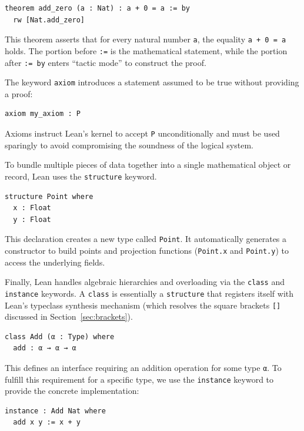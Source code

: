 \begin{lstlisting}[language=Lean]
theorem add_zero (a : Nat) : a + 0 = a := by
  rw [Nat.add_zero]
\end{lstlisting}

This theorem asserts that for every natural number \lstinline|a|, the equality \lstinline|a + 0 = a| holds. The portion before \lstinline|:=| is the mathematical statement, while the portion after \lstinline|:= by| enters ``tactic mode'' to construct the proof.

The keyword \lstinline|axiom| introduces a statement assumed to be true without providing a proof:

\begin{lstlisting}[language=Lean]
axiom my_axiom : P
\end{lstlisting}

Axioms instruct Lean's kernel to accept \lstinline|P| unconditionally and must be used sparingly to avoid compromising the soundness of the logical system.

To bundle multiple pieces of data together into a single mathematical object or record, Lean uses the \lstinline|structure| keyword.

\begin{lstlisting}[language=Lean]
structure Point where
  x : Float
  y : Float
\end{lstlisting}

This declaration creates a new type called \lstinline|Point|. It automatically generates a
constructor to build points and projection functions (\lstinline|Point.x| and \lstinline|Point.y|) to access the underlying fields.

Finally, Lean handles algebraic hierarchies and overloading via the
\lstinline|class| and \lstinline|instance| keywords. A \lstinline|class| is
essentially a \lstinline|structure| that registers itself with Lean's typeclass
synthesis mechanism (which resolves the square brackets \lstinline|[]| discussed in
Section~\ref{sec:brackets}).

\begin{lstlisting}[language=Lean]
class Add (α : Type) where
  add : α → α → α
\end{lstlisting}

This defines an interface requiring an addition operation for some type \lstinline|α|. To fulfill this requirement for a specific type, we use the \lstinline|instance| keyword to provide the concrete implementation:

\begin{lstlisting}[language=Lean]
instance : Add Nat where
  add x y := x + y
\end{lstlisting}


